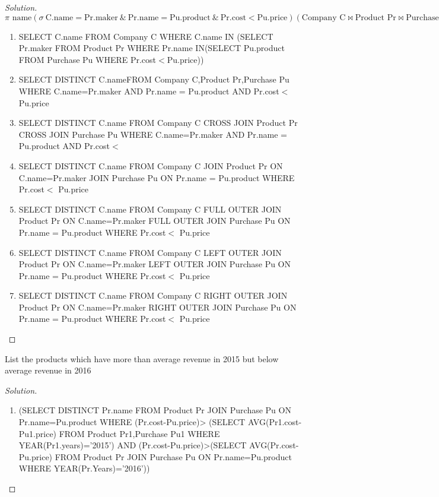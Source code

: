 \documentclass[10pt,a4paper]{article}
\newenvironment{problem}[2][Problem]{\begin{trivlist}
\item[\hskip \labelsep {\bfseries #1}\hskip \labelsep {\bfseries #2.}]}{\end{trivlist}}
\begin{document}
\begin{proof}[Solution]
\begin{equation}
\pi \text{ name} ( \sigma \ \text{C.name} = \text{Pr.maker} \ \& \ \text{Pr.name} = \text{Pu.product} \ \& \ \text{Pr.cost} < \text{Pu.price}) (\text{Company C} \bowtie \text{Product Pr} \bowtie \text{Purchase Pu})) 
\end{equation}

\begin{enumerate}
	\item SELECT C.name FROM Company C WHERE C.name IN (SELECT Pr.maker FROM Product Pr WHERE Pr.name IN(SELECT Pu.product FROM Purchase Pu WHERE Pr.cost$<$Pu.price))
			\item SELECT DISTINCT C.nameFROM Company C,Product Pr,Purchase Pu
WHERE C.name=Pr.maker AND Pr.name = Pu.product AND  Pr.cost$<$ Pu.price
	\item SELECT DISTINCT C.name FROM Company C CROSS JOIN Product Pr CROSS JOIN Purchase Pu WHERE C.name=Pr.maker AND Pr.name = Pu.product AND  Pr.cost$<$
	\item SELECT DISTINCT C.name FROM Company C JOIN Product Pr
ON C.name=Pr.maker JOIN Purchase Pu ON Pr.name = Pu.product WHERE Pr.cost$<$ Pu.price 
	\item SELECT DISTINCT C.name FROM Company C FULL OUTER JOIN Product Pr
ON C.name=Pr.maker FULL OUTER JOIN Purchase Pu ON Pr.name = Pu.product WHERE Pr.cost$<$ Pu.price 
	\item SELECT DISTINCT C.name FROM Company C LEFT OUTER JOIN Product Pr ON C.name=Pr.maker LEFT OUTER JOIN Purchase Pu ON Pr.name = Pu.product WHERE Pr.cost$<$ Pu.price
	\item SELECT DISTINCT C.name FROM Company C RIGHT OUTER JOIN Product Pr ON C.name=Pr.maker RIGHT OUTER JOIN Purchase Pu ON Pr.name = Pu.product WHERE Pr.cost$<$ Pu.price
\end{enumerate}
\end{proof}

\begin{problem}{10}
List the products which have more than average revenue in 2015 but below average revenue in 2016
\end{problem}

\begin{proof}[Solution]
\begin{enumerate}
	\item (SELECT DISTINCT Pr.name FROM Product Pr JOIN Purchase Pu
ON Pr.name=Pu.product WHERE (Pr.cost-Pu.price)> (SELECT AVG(Pr1.cost- Pu1.price) FROM Product Pr1,Purchase Pu1 WHERE YEAR(Pr1.years)='2015') AND (Pr.cost-Pu.price)>(SELECT AVG(Pr.cost-Pu.price) FROM Product Pr JOIN Purchase Pu ON Pr.name=Pu.product WHERE YEAR(Pr.Years)='2016'))
\end{enumerate}
\end{proof}
\end{document}
